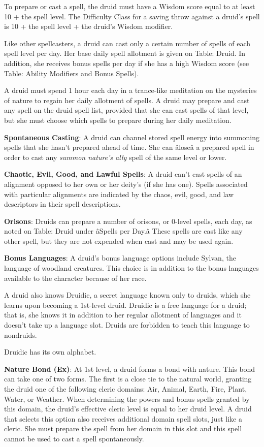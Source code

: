 To prepare or cast a spell, the druid must have a Wisdom score equal to at least 10 + the spell level. The Difficulty Class for a saving throw against a druid's spell is 10 + the spell level + the druid's Wisdom modifier.
				
Like other spellcasters, a druid can cast only a certain number of spells of each spell level per day. Her base daily spell allotment is given on Table: Druid. In addition, she receives bonus spells per day if she has a high Wisdom score (see Table: Ability Modifiers and Bonus Spells).
				
A druid must spend 1 hour each day in a trance-like meditation on the mysteries of nature to regain her daily allotment of spells. A druid may prepare and cast any spell on the druid spell list, provided that she can cast spells of that level, but she must choose which spells to prepare during her daily meditation.
				
\textbf{Spontaneous Casting}: A druid can channel stored spell energy into summoning spells that she hasn't prepared ahead of time. She can \^alose\^a a prepared spell in order to cast any \textit{summon nature's ally} spell of the same level or lower. 
				
\textbf{Chaotic, Evil, Good, and Lawful Spells}: A druid can't cast spells of an alignment opposed to her own or her deity's (if she has one). Spells associated with particular alignments are indicated by the chaos, evil, good, and law descriptors in their spell descriptions.
				
\textbf{Orisons}: Druids can prepare a number of orisons, or 0-level spells, each day, as noted on Table: Druid under \^aSpells per Day.\^a These spells are cast like any other spell, but they are not expended when cast and may be used again.
				
\textbf{Bonus Languages}: A druid's bonus language options include Sylvan, the language of woodland creatures. This choice is in addition to the bonus languages available to the character because of her race.
				
A druid also knows Druidic, a secret language known only to druids, which she learns upon becoming a 1st-level druid. Druidic is a free language for a druid; that is, she knows it in addition to her regular allotment of languages and it doesn't take up a language slot. Druids are forbidden to teach this language to nondruids.
				
Druidic has its own alphabet.
				
\textbf{Nature Bond (Ex)}: At 1st level, a druid forms a bond with nature. This bond can take one of two forms. The first is a close tie to the natural world, granting the druid one of the following cleric domains: Air, Animal, Earth, Fire, Plant, Water, or Weather. When determining the powers and bonus spells granted by this domain, the druid's effective cleric level is equal to her druid level. A druid that selects this option also receives additional domain spell slots, just like a cleric. She must prepare the spell from her domain in this slot and this spell cannot be used to cast a spell spontaneously.
				
